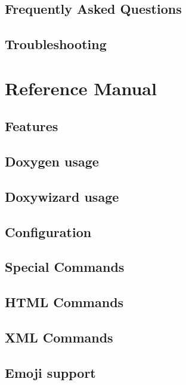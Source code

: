 \documentclass{book}
\newcommand{\+}{\discretionary{\mbox{\scriptsize$\hookleftarrow$}}{}{}}
\begin{document}
\chapter{Frequently Asked Questions}\label{faq}\hypertarget{faq}{}
\chapter{Troubleshooting}\label{trouble}\hypertarget{trouble}{}
\part{Reference Manual}
\chapter{Features}\label{features}\hypertarget{features}{}
\chapter{Doxygen usage}\label{doxygen_usage}\hypertarget{doxygen_usage}{}
\chapter{Doxywizard usage}\label{doxywizard_usage}\hypertarget{doxywizard_usage}{}
\chapter{Configuration}\label{config}\hypertarget{config}{}
\chapter{Special Commands}\label{commands}\hypertarget{commands}{}
\chapter{HTML Commands}\label{htmlcmds}\hypertarget{htmlcmds}{}
\chapter{XML Commands}\label{xmlcmds}\hypertarget{xmlcmds}{}
\chapter{Emoji support}\label{emojisup}\hypertarget{emojisup}{}
\end{document}
